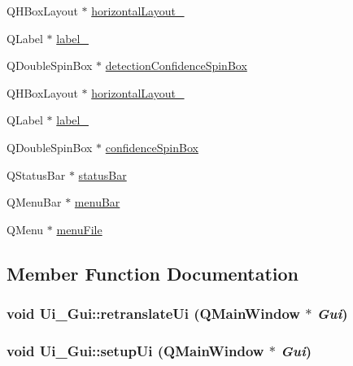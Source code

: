 \begin{DoxyCompactItemize}
\item 
QHBoxLayout $\ast$ \hyperlink{classUi__Gui_aca4f37270d9455b72999cb73fd197d5d}{horizontalLayout\_}
\item 
QLabel $\ast$ \hyperlink{classUi__Gui_a39ac757b754895099f543f5cd31df5c0}{label\_}
\item 
QDoubleSpinBox $\ast$ \hyperlink{classUi__Gui_a443cf0db8cdc01eeefba083e505e3ccb}{detectionConfidenceSpinBox}
\item 
QHBoxLayout $\ast$ \hyperlink{classUi__Gui_a04f0f0ebebff6b0c57118002d4206521}{horizontalLayout\_}
\item 
QLabel $\ast$ \hyperlink{classUi__Gui_a7f4af6f8f0f817163cb1883bb378e468}{label\_}
\item 
QDoubleSpinBox $\ast$ \hyperlink{classUi__Gui_abe54d148aadd144c122e1ed269a5f572}{confidenceSpinBox}
\item 
QStatusBar $\ast$ \hyperlink{classUi__Gui_ac8814dd3cd1e3d421e0d027f048aa8ef}{statusBar}
\item 
QMenuBar $\ast$ \hyperlink{classUi__Gui_a52e0cfb41876e30e704cc59c5f143afa}{menuBar}
\item 
QMenu $\ast$ \hyperlink{classUi__Gui_a9b6ca26e1c5b8018a71df8e7cb4a385c}{menuFile}
\end{DoxyCompactItemize}


\subsection{Member Function Documentation}
\hypertarget{classUi__Gui_a19b2bac2de017782b9a5cae039980387}{
\subsubsection[{retranslateUi}]{\setlength{\rightskip}{0pt plus 5cm}void Ui\_\-Gui::retranslateUi (QMainWindow $\ast$ {\em Gui})}}
\label{classUi__Gui_a19b2bac2de017782b9a5cae039980387}
\hypertarget{classUi__Gui_ac7b48f664dfaf8cec328b4234401e522}{
\subsubsection[{setupUi}]{\setlength{\rightskip}{0pt plus 5cm}void Ui\_\-Gui::setupUi (QMainWindow $\ast$ {\em Gui})}}
\label{classUi__Gui_ac7b48f664dfaf8cec328b4234401e522}


